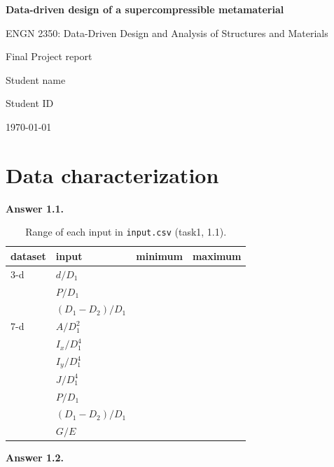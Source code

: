 \documentclass[11pt]{article}
\newcommand{\ans}[1]{\textbf{Answer #1.}}            %
\newcommand{\nb}[2]{{\small(task#1, #2)}}            %
\begin{document}
\begin{titlepage}
\centering
\vspace*{5cm}
{\LARGE\bfseries Data-driven design of a supercompressible metamaterial\par}
\vspace{1.5cm}
{\large ENGN 2350: Data-Driven Design and Analysis of Structures and Materials\par}
\vspace{1cm}
{\large Final Project report\par}
\vspace{2cm}
{\large Student name\par}
{\large Student ID\par}
\vspace{1cm}
{\large \today\par}
\end{titlepage}
\setcounter{page}{1}

\section{Data characterization}

\ans{1.1} %

\begin{table}[htb]\centering\small
\caption{Range of each input in \texttt{input.csv} \nb{1}{1.1}.}
\begin{tabular}{@{}llcc@{}}\toprule
dataset & input & minimum & maximum\\\midrule
3-d & $d/D_1$ & & \\
    & $P/D_1$ & & \\
    & $(D_1-D_2)/D_1$ & & \\\midrule
7-d & $A/D_1^2$ & & \\
    & $I_x/D_1^4$ & & \\
    & $I_y/D_1^4$ & & \\
    & $J/D_1^4$ & & \\
    & $P/D_1$ & & \\
    & $(D_1-D_2)/D_1$ & & \\
    & $G/E$ & & \\\bottomrule
\end{tabular}
\end{table}

\ans{1.2} %
\end{document}
